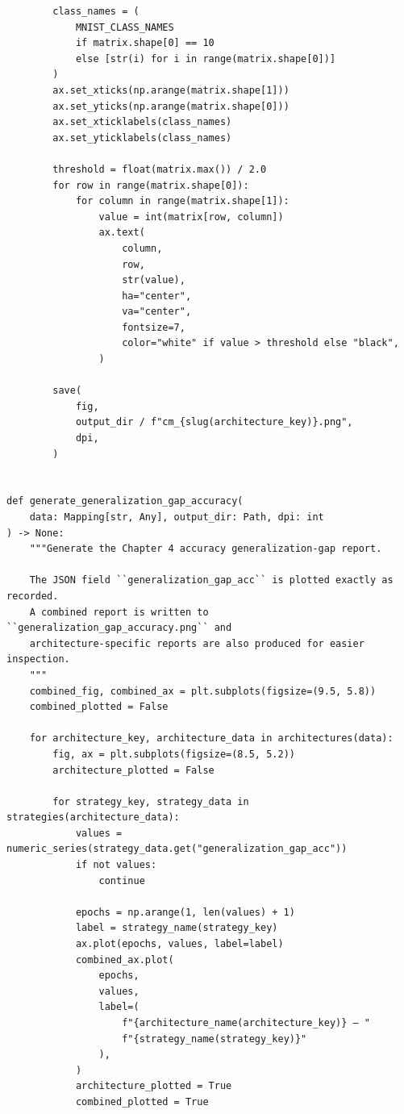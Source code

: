 \begin{verbatim}
        class_names = (
            MNIST_CLASS_NAMES
            if matrix.shape[0] == 10
            else [str(i) for i in range(matrix.shape[0])]
        )
        ax.set_xticks(np.arange(matrix.shape[1]))
        ax.set_yticks(np.arange(matrix.shape[0]))
        ax.set_xticklabels(class_names)
        ax.set_yticklabels(class_names)

        threshold = float(matrix.max()) / 2.0
        for row in range(matrix.shape[0]):
            for column in range(matrix.shape[1]):
                value = int(matrix[row, column])
                ax.text(
                    column,
                    row,
                    str(value),
                    ha="center",
                    va="center",
                    fontsize=7,
                    color="white" if value > threshold else "black",
                )

        save(
            fig,
            output_dir / f"cm_{slug(architecture_key)}.png",
            dpi,
        )


def generate_generalization_gap_accuracy(
    data: Mapping[str, Any], output_dir: Path, dpi: int
) -> None:
    """Generate the Chapter 4 accuracy generalization-gap report.

    The JSON field ``generalization_gap_acc`` is plotted exactly as recorded.
    A combined report is written to ``generalization_gap_accuracy.png`` and
    architecture-specific reports are also produced for easier inspection.
    """
    combined_fig, combined_ax = plt.subplots(figsize=(9.5, 5.8))
    combined_plotted = False

    for architecture_key, architecture_data in architectures(data):
        fig, ax = plt.subplots(figsize=(8.5, 5.2))
        architecture_plotted = False

        for strategy_key, strategy_data in strategies(architecture_data):
            values = numeric_series(strategy_data.get("generalization_gap_acc"))
            if not values:
                continue

            epochs = np.arange(1, len(values) + 1)
            label = strategy_name(strategy_key)
            ax.plot(epochs, values, label=label)
            combined_ax.plot(
                epochs,
                values,
                label=(
                    f"{architecture_name(architecture_key)} — "
                    f"{strategy_name(strategy_key)}"
                ),
            )
            architecture_plotted = True
            combined_plotted = True


\end{verbatim}
